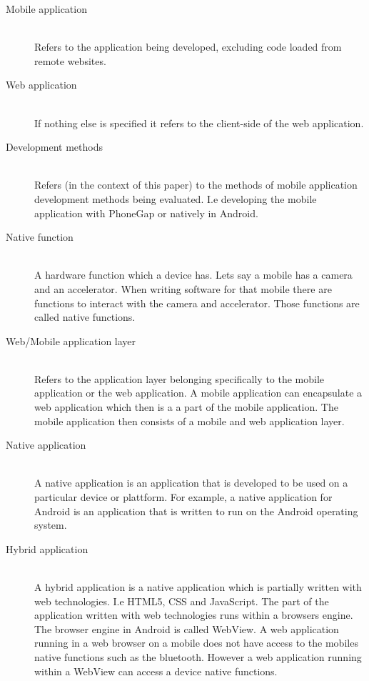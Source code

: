\begin{description}
  \item[Mobile application] \hfill \\
    Refers to the application being developed, excluding code loaded from remote websites.
  \item[Web application] \hfill \\
    If nothing else is specified it refers to the client-side of the web application.
  \item[Development methods] \hfill \\
    Refers (in the context of this paper) to the methods of mobile application development methods being evaluated. I.e developing the mobile application with PhoneGap or natively in Android.
  \item[Native function] \hfill \\
     A hardware function which a device has. Lets say a mobile has a camera and an accelerator. When writing software for that mobile there are functions to interact with the camera and accelerator. Those functions are called native functions.
  \item[Web/Mobile application layer] \hfill \\
	Refers to the application layer belonging specifically to the mobile application or the web application. A mobile application can encapsulate a web application which then is a a part of the mobile application. The mobile application then consists of a mobile and web application layer.
	\item[Native application] \hfill \\
	A native application is an application that is developed to be used on a particular device or plattform. For example, a native application for Android is an application that is written to run on the Android operating system. 
\item[Hybrid application] \hfill \\
	A hybrid application is a native application which is partially written with web technologies. I.e HTML5, CSS and JavaScript. The part of the application written with web technologies runs within a browsers engine. The browser engine in Android is called WebView. A web application running in a web browser on a mobile does not have access to the mobiles native functions such as the bluetooth. However a web application running within a WebView can access a device native functions. 
\end{description}

